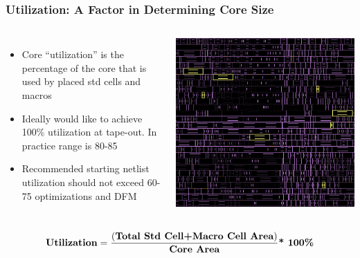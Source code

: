\documentclass[compress]{beamer}
\begin{document}
\begin{frame}
	\frametitle{Utilization: A Factor in Determining Core Size}
	\begin{columns}	
		\begin{itemize}
			\item Core “utilization” is the
			percentage of the core that is
			used by placed std cells and
			macros
			\item Ideally would like to achieve
			100\% utilization at tape-out. In
			practice range is 80-85%
			\item Recommended starting netlist
			utilization should not exceed
			60-75%
			optimizations and DFM
		\end{itemize}
		\begin{center}
			\includegraphics[width=0.8 \textwidth]{Utilization}
		\end{center}
	\end{columns}
		 \begin{equation}    %
		\textbf{Utilization} = \frac{(\textbf{Total Std Cell} \textbf{\textbf{+}} \textbf{Macro Cell Area})}{\textbf{Core Area}} \textbf{* 100\%}
	\end{equation}
\end{frame}
\end{document}
